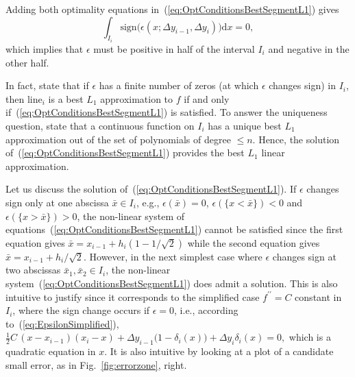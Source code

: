 \documentclass[a4paper,english]{IEEEtran}
\begin{document}
Adding both optimality equations in~(\ref{eq:OptConditionsBestSegmentL1})
gives
\[
\int_{I_{i}}{\text{sign}}\bigl(\epsilon(x;\Delta y_{i-1},\Delta y_{i})\bigr){\mathrm{d}} x=0,
\]
which implies that $\epsilon$ must be positive in half of the interval
$I_{i}$ and negative in the other half.

In fact, \cite{KripkeRivlin1965}\cite[Cor. 3.1.1]{Rivlin1969} state
that if $\epsilon$ has a finite number of zeros (at which $\epsilon$
changes sign) in $I_{i}$, then ${\mathrm{line}_{i}}$ is a best ${L_{1}}$ approximation
to ${f}$ if and only if~(\ref{eq:OptConditionsBestSegmentL1}) is
satisfied. To answer the uniqueness question, \cite{Jackson1921Note}\cite{Jackson1930}\cite[Thm 3.2]{Rivlin1969}
state that a continuous function on $I_{i}$ has a unique best ${L_{1}}$
approximation out of the set of polynomials of degree $\leq n$. Hence,
the solution of~(\ref{eq:OptConditionsBestSegmentL1}) provides the
best ${L_{1}}$ linear approximation.

Let us discuss the solution of~(\ref{eq:OptConditionsBestSegmentL1}).
If $\epsilon$ changes sign only at one abscissa $\bar{x}\in I_{i}$,
e.g., $\epsilon(\bar{x})=0$, $\epsilon(\{x<\bar{x}\})<0$ and $\epsilon(\{x>\bar{x}\})>0$,
the non-linear system of equations~(\ref{eq:OptConditionsBestSegmentL1})
cannot be satisfied since the first equation gives $\bar{x}=x_{i-1}+h_{i}(1-1/\sqrt{2})$
while the second equation gives $\bar{x}=x_{i-1}+h_{i}/\sqrt{2}$.
However, in the next simplest case where $\epsilon$ changes sign
at two abscissas $\bar{x}_{1},\bar{x}_{2}\in I_{i}$, the non-linear
system~(\ref{eq:OptConditionsBestSegmentL1}) does admit a solution.
This is also intuitive to justify since it corresponds to the simplified
case ${{f}^{\prime\prime}}=C$ constant in~$I_{i}$, where the sign change occurs
if $\epsilon=0$, i.e., according to~(\ref{eq:EpsilonSimplified}),
$\frac{1}{2}C\,(x-x_{i-1})(x_{i}-x)+\Delta y_{i-1}\bigl(1-\delta_{i}(x)\bigr)+\Delta y_{i}\delta_{i}(x)=0,$
which is a quadratic equation in $x$. It is also intuitive by looking
at a plot of a candidate small error, as in Fig.~\ref{fig:errorzone},
right.
\end{document}
